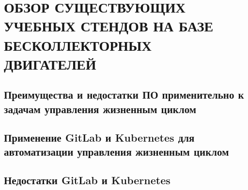 \chapter{ОБЗОР СУЩЕСТВУЮЩИХ УЧЕБНЫХ СТЕНДОВ НА БАЗЕ БЕСКОЛЛЕКТОРНЫХ ДВИГАТЕЛЕЙ}
\label{cha:analysis}

\section{Преимущества и недостатки ПО применительно к задачам управления жизненным циклом}

\section{Применение GitLab и Kubernetes для автоматизации управления жизненным циклом}

\cite{vkrsen}
\cite{linuxPocket}
\cite{devOpsPhy}
\cite{likeGoogle}
\cite{kuberForDevOps}
\cite{fasterDevOps}
\cite{cd}
\cite{ciCd}
\cite{web:docker:docs}
\cite{web:gitlab:docs}
\cite{web:docker:swarm}
\cite{web:npm:docs}
\cite{web:github:docs}
\cite{web:space:docs}
\cite{web:git:book}
\cite{web:bitbucket}
\cite{web:git-reps:rating}
\cite{web:gitlab}
\cite{web:docker-kubernetes}

\section{Недостатки GitLab и Kubernetes}


